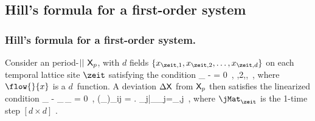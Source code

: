 
    \ifblog
\subsection{Hill's formula for a first-order system}
\label{exam:Hill1stOrd}
    \else %
\subsubsection{Hill's formula for a first-order system.}
\label{exam:Hill1stOrd}
    \fi



Consider an period-${||}$ {\lattstate} $\mathsf{X}_p$, with $d$ fields
$\{\ssp_{\zeit,1},\ssp_{\zeit,2},\dots,\ssp_{\zeit,d}\}$ on each temporal
lattice site $\zeit$ satisfying the condition
\beq
\ssp_{\zeit} -  = 0
    \,,\quad
{},2,\cdots,\cl{}
\,,
where $\flow{}{\ssp}$ is a $d$\dmn\ function.
A deviation $\Delta\mathsf{X}$ from $\mathsf{X}_p$ then satisfies the linearized condition
\beq
\Delta\ssp_{\zeit} - \jMat_{}\,\Delta\ssp_{} = 0
\,,\qquad
(\jMat_{\zeit})_{ij}
=
\left.
           {\partial \ssp_{j}}\right|_{\ssp_{j}=\ssp_{\zeit,j}}
\,,
where $\jMat_{\zeit}$ is the 1-time step $[d\!\times\!{d}]$
\jacobianM.

